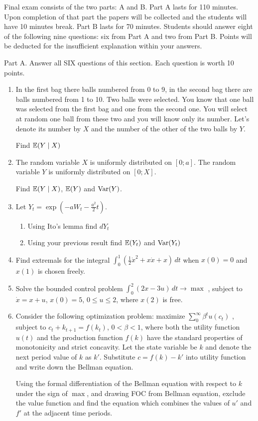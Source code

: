 \documentclass[pdftex,12pt,a4paper]{article}
\begin{document}
Final exam consists of the two parts: A and B. Part A lasts for 110 minutes.
Upon completion of that part the papers will be collected and the students will have 10 minutes break. 
Part B lasts for 70 minutes.
Students should answer eight of the following nine questions: six from Part A  and two from Part B. 
Points will be deducted for the insufficient explanation within your answers.

Part A.
Answer all SIX questions of this section. Each question is worth 10 points.

\begin{enumerate}
\item In the first bag there balls numbered from 0 to 9, in the second bag there are balls numbered from 1 to 10. Two balls were selected. You know that one ball was selected from the first bag and one from the second one. You will select at random one ball from these two and you will know only its number. Let’s denote its number by $X$ and the number of the other of the two balls by $Y$.

Find $\mathbb{E}(Y\mid X)$ 

\item The random variable $X$ is uniformly distributed on $[0;a]$. The random variable $Y$ is uniformly distributed on $[0;X]$.

Find $\mathbb{E}(Y\mid X)$, $\mathbb{E}(Y)$  and $\operatorname{Var}(Y)$.
\item Let 
$Y_t=\exp\left(-aW_t-\frac{a^2}{2}t\right)$.
\begin{enumerate}
\item Using Ito’s lemma find $dY_t$ 
\item Using your previous result find $\mathbb{E}(Y_t)$ and $\operatorname{Var}(Y_t)$
\end{enumerate}

\item Find extremals for the integral 
$\int_0^1 \left(\frac{1}{2}\dot{x}^2+x\dot{x}+x\right)\, dt$
when $x(0)=0$ and $x(1)$ is chosen freely.

\item Solve the bounded control problem
$\int_0^2 (2x-3u)\,dt \to \max$
, subject to $\dot{x}=x+u$, $x(0)=5$, $0\leq u \leq 2$, where $x(2)$ is free.

\item Consider the following optimization problem: maximize 
$\sum_0^{\infty}\beta^t u(c_t)$
, subject to $c_t+k_{t+1}=f(k_t)$, $0<\beta<1$, where both the utility function $u(t)$  and the production function $f(k)$ have the standard properties of monotonicity and strict concavity. Let the state variable be $k$ and denote the next period value of $k$ as $k'$. Substitute $c=f(k)-k'$ into utility function and write down the Bellman equation.


Using the formal differentiation of the Bellman equation with respect to $k$ under the sign of $\max$, and drawing  FOC from Bellman equation, exclude the value function and find the equation which combines the values of $u'$ and $f'$  at the adjacent time periods.

\end{enumerate}
\end{document}

